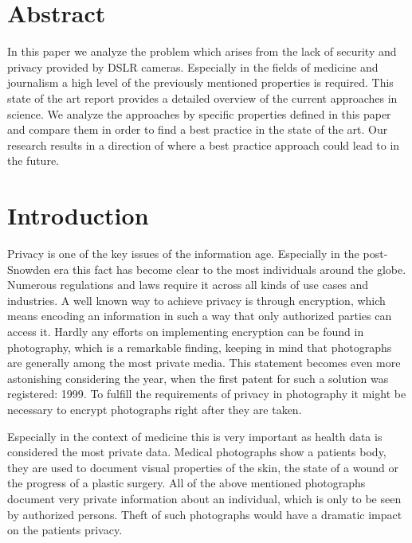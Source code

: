 \documentclass[12pt,a4paper,titlepage,oneside]{scrartcl}
\begin{document}
\maketitle
\setcounter{section}{0}
\setcounter{tocdepth}{2}
\tableofcontents
\newpage

\section*{Abstract}
In this paper we analyze the problem which arises from the lack of security and privacy provided by DSLR cameras.
Especially in the fields of medicine and journalism a high level of the previously mentioned properties is required.
This state of the art report provides a detailed overview of the current approaches in science.
We analyze the approaches by specific properties defined in this paper and compare them in order to find a best practice in the state of the art.
Our research results in a direction of where a best practice approach could lead to in the future.

\newpage
\section{Introduction}

Privacy is one of the key issues of the information age.
Especially in the post-Snowden era this fact has become clear to the most individuals around the globe. 
Numerous regulations and laws \cite{EHG2015, DSG2000, ELGA2012, EuropeanParliament2016, EuropeanCourtofHumanRights2010} require it across all kinds of use cases and industries.
A well known way to achieve privacy is through encryption, which means encoding an information in such a way that only authorized parties can access it. 
Hardly any efforts on implementing encryption can be found in photography, which is a remarkable finding, keeping in mind that photographs are generally among the most private media.
This statement becomes even more astonishing considering the year, when the first patent for such a solution was registered: 1999. \cite{steinberg1999method}
To fulfill the requirements of privacy in photography it might be necessary to encrypt photographs right after they are taken.

Especially in the context of medicine this is very important as health data is considered the most private data. \cite{williams2013}
Medical photographs show a patients body, they are used to document visual properties of the skin, the state of a wound or the progress of a plastic surgery. 
All of the above mentioned photographs document very private information about an individual, which is only to be seen by authorized persons.
Theft of such photographs would have a dramatic impact on the patients privacy.
\end{document}
